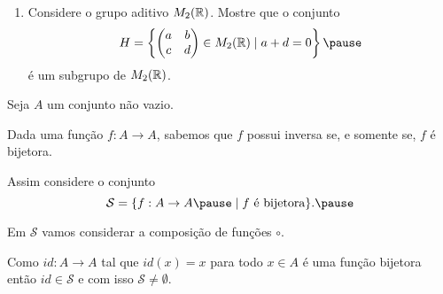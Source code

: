 \documentclass{beamer}
\begin{document}
    \begin{frame}
        \begin{exemplos}
            \begin{enumerate}[label={\roman*})]
                \conti
                \item Considere o grupo aditivo $M_2(\mathbb{R})$. \pause Mostre que o conjunto\pause
                \[
                    H = \left\{\begin{pmatrix}
                        a & b\\c & d
                    \end{pmatrix} \in M_2(\real) \mid a + d = 0\right\} \pause
                \]
                é um subgrupo de $M_2(\mathbb{R})$.
            \end{enumerate}
        \end{exemplos}
    \end{frame}

     \begin{frame}
        Seja $A$ um conjunto não vazio.\pause

        \vspace{.3cm}

        Dada uma função $f : A \to A$, sabemos que $f$ possui inversa \pause se, e somente se, $f$ é bijetora.\pause

        \vspace{.3cm}

        Assim considere o conjunto\pause
        \[
            \mathcal{S} = \{ f : A \to A \pause \mid f \mbox{ é bijetora}\}.\pause
        \]

        Em $\mathcal{S}$ vamos considerar a composição de funç\~oes $\circ$.\pause

        \vspace{.3cm}

        Como $id : A \to A$ tal que $id(x) = x$ para todo $x \in A$ \pause é uma função bijetora \pause então $id \in \mathcal{S}$ \pause e com isso $\mathcal{S} \ne \emptyset$.
    \end{frame}
\end{document}
